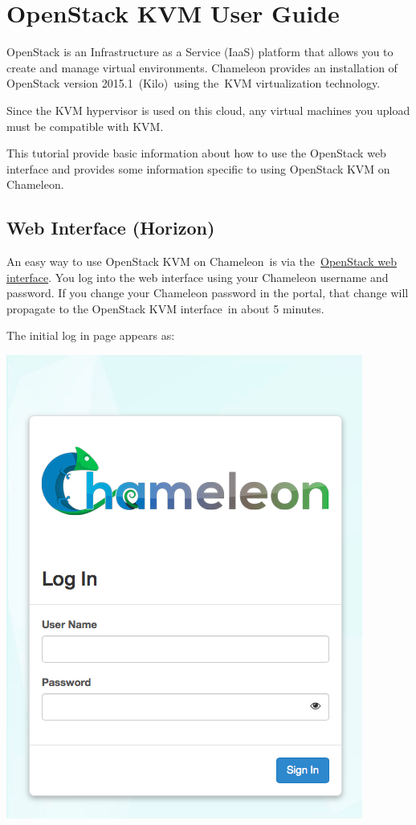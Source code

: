 \FILENAME

\chapter{OpenStack KVM User Guide}\label{alamo-user-guide}

OpenStack is an Infrastructure as a Service (IaaS) platform that allows
you to create and manage virtual environments. Chameleon provides an
installation of OpenStack version 2015.1~(Kilo)~using the~KVM
virtualization technology.

Since the KVM hypervisor is used on this cloud, any virtual machines you
upload must be compatible with KVM.

This tutorial provide basic information about how to use the OpenStack
web interface and provides some information specific to using OpenStack
KVM on Chameleon.

\section{Web Interface (Horizon)}\label{web-interface-horizon}

An easy way to use OpenStack KVM on Chameleon~is via
the~\href{https://openstack.tacc.chameleoncloud.org/dashboard}{OpenStack
web interface}. You log into the web interface using your Chameleon
username and password. If you change your Chameleon password in the
portal, that change will propagate to the OpenStack KVM interface~in
about 5 minutes.

The initial log in page appears as:


\includegraphics[width=0.5\columnwidth]{images/chameleon/chameleon-login.png}

